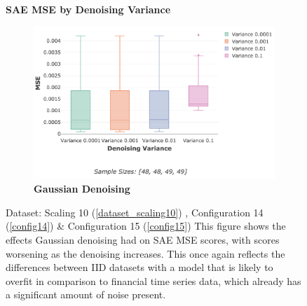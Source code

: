 \documentclass[a4paper,11pt,oneside]{article}
\theoremstyle{plain}
\theoremstyle{definition}
\begin{document}
\begin{figure}[H]
{	}
	\label{figure-mse_reg}
	\end{figure}

	\begin{figure}[H]
	\centering
	\textbf{SAE MSE by Denoising Variance}
	\begin{subfigure}{.99\textwidth}
		\centering 
		\includegraphics[scale=0.305 ]{images/results/8_6_complexity/actual_mse_gaussian.png}
		\caption{\textbf{Gaussian Denoising} 
			\newline }
		\label{figure-actual_mse_gaussian}
	\end{subfigure}%
	\caption[SAE MSE by Denoising Variance]
	{Dataset: Scaling 10 (\ref{dataset_scaling10}) , Configuration 14 (\ref{config14}) \& Configuration 15 (\ref{config15})
		\newline This figure shows the effects Gaussian denoising had on SAE MSE scores, with scores worsening as the denoising increases. This once again reflects the differences between IID datasets with a model that is likely to overfit in comparison to financial time series data, which already has a significant amount of noise present.}
	\label{figure-results_mse_denoising}
	\end{figure}
\end{document}
